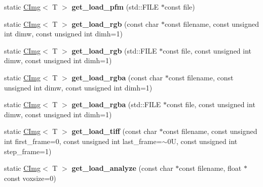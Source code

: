 \begin{DoxyCompactItemize}
\item 
\hypertarget{structcimg__library_1_1CImg_a0072239a9a892f9f8d231ef7d745299d}{
static \hyperlink{structcimg__library_1_1CImg}{CImg}$<$ T $>$ {\bfseries get\_\-load\_\-pfm} (std::FILE $\ast$const file)}
\label{structcimg__library_1_1CImg_a0072239a9a892f9f8d231ef7d745299d}

\item 
\hypertarget{structcimg__library_1_1CImg_a5f3132e636ec0182840e78eceb336316}{
static \hyperlink{structcimg__library_1_1CImg}{CImg}$<$ T $>$ {\bfseries get\_\-load\_\-rgb} (const char $\ast$const filename, const unsigned int dimw, const unsigned int dimh=1)}
\label{structcimg__library_1_1CImg_a5f3132e636ec0182840e78eceb336316}

\item 
\hypertarget{structcimg__library_1_1CImg_a9e369eb363ea3e16f67a4179aef1b61c}{
static \hyperlink{structcimg__library_1_1CImg}{CImg}$<$ T $>$ {\bfseries get\_\-load\_\-rgb} (std::FILE $\ast$const file, const unsigned int dimw, const unsigned int dimh=1)}
\label{structcimg__library_1_1CImg_a9e369eb363ea3e16f67a4179aef1b61c}

\item 
\hypertarget{structcimg__library_1_1CImg_a0f30b8c2f375ee0838bb9352d928e9b9}{
static \hyperlink{structcimg__library_1_1CImg}{CImg}$<$ T $>$ {\bfseries get\_\-load\_\-rgba} (const char $\ast$const filename, const unsigned int dimw, const unsigned int dimh=1)}
\label{structcimg__library_1_1CImg_a0f30b8c2f375ee0838bb9352d928e9b9}

\item 
\hypertarget{structcimg__library_1_1CImg_ade3d979babf8d9c5ed904fbd0c60cdd0}{
static \hyperlink{structcimg__library_1_1CImg}{CImg}$<$ T $>$ {\bfseries get\_\-load\_\-rgba} (std::FILE $\ast$const file, const unsigned int dimw, const unsigned int dimh=1)}
\label{structcimg__library_1_1CImg_ade3d979babf8d9c5ed904fbd0c60cdd0}

\item 
\hypertarget{structcimg__library_1_1CImg_a7d33b41658d4adde6c99a41a036909a6}{
static \hyperlink{structcimg__library_1_1CImg}{CImg}$<$ T $>$ {\bfseries get\_\-load\_\-tiff} (const char $\ast$const filename, const unsigned int first\_\-frame=0, const unsigned int last\_\-frame=$\sim$0U, const unsigned int step\_\-frame=1)}
\label{structcimg__library_1_1CImg_a7d33b41658d4adde6c99a41a036909a6}

\item 
\hypertarget{structcimg__library_1_1CImg_a171911b3cc4caeb64577ba093d8fc14d}{
static \hyperlink{structcimg__library_1_1CImg}{CImg}$<$ T $>$ {\bfseries get\_\-load\_\-analyze} (const char $\ast$const filename, float $\ast$const voxsize=0)}
\label{structcimg__library_1_1CImg_a171911b3cc4caeb64577ba093d8fc14d}


\end{DoxyCompactItemize}
